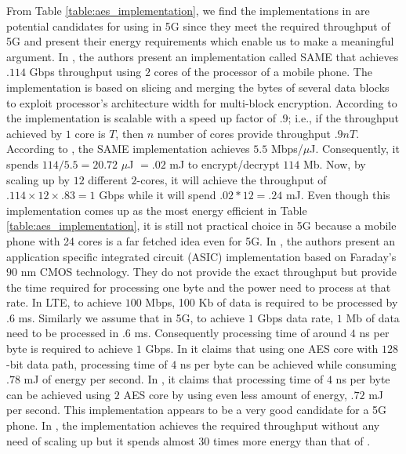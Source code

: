 \documentclass[lnicst,sechang,a4paper]{svmultln}
\begin{document}
From Table \ref{table:aes_implementation}, we find the implementations in \cite{Ruhr_2009, Ruhr_2011, Pune_2012} are potential candidates for using in 5G since they meet the required throughput of 5G and present their energy requirements which enable us to make a meaningful argument. In \cite{Ruhr_2011}, the authors present an implementation called SAME that achieves $.114$ Gbps throughput using $2$ cores of the processor of a mobile phone. The implementation is based on slicing and merging the bytes of several data blocks to exploit processor's architecture width for multi-block encryption. According to \cite[Figure 8]{Ruhr_2011} the implementation is scalable with a speed up factor of $.9$; i.e., if the throughput achieved by $1$ core is $T$, then $n$ number of cores provide throughput $.9nT$. According to \cite[Figure 9]{Ruhr_2011}, the SAME implementation achieves $5.5$ Mbps/$\mu$J. Consequently, it spends $114/5.5 = 20.72$ $\mu$J $=.02$ mJ to encrypt/decrypt $114$ Mb. Now, by scaling up by $12$ different $2$-cores, it will achieve the throughput of $.114 \times 12 \times .83 = 1$ Gbps while it will spend $.02*12=.24$ mJ. Even though this implementation comes up as the most energy efficient in Table \ref{table:aes_implementation}, it is still not practical choice in 5G because a mobile phone with 24 cores is a far fetched idea even for 5G. In \cite{Ruhr_2009}, the authors present an application specific integrated circuit (ASIC) implementation based on Faraday's $90$ nm CMOS technology. They do not provide the exact throughput but provide the time required for processing one byte and the power need to process at that rate. In LTE, to achieve $100$ Mbps, 100 Kb of data is required to be processed by $.6$ ms. Similarly we assume that in 5G, to achieve $1$ Gbps data rate, $1$ Mb of data need to be processed in $.6$ ms. Consequently processing time of around $4$ ns per byte is required to achieve $1$ Gbps. In \cite[Figure 8]{Ruhr_2009} it claims that using one AES core with $128$-bit data path, processing time of $4$ ns per byte can be achieved while consuming $.78$ mJ of energy per second. In \cite[Figure 10]{Ruhr_2009}, it claims that processing time of $4$ ns per byte can be achieved using $2$ AES core by using even less amount of energy, $.72$ mJ per second. This implementation appears to be a very good candidate for a 5G phone.  In \cite{Pune_2012}, the implementation achieves the required throughput without any need of scaling up but it spends almost $30$ times more energy than that of \cite{Ruhr_2009}.
\end{document}
